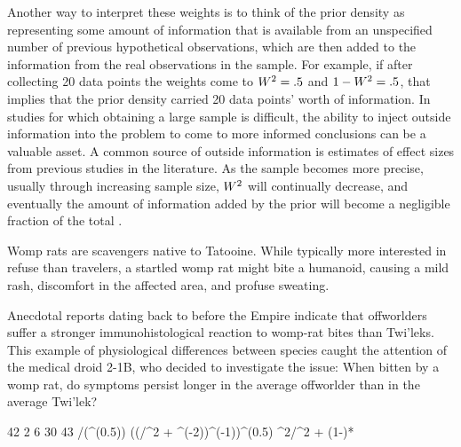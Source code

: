 Another way to interpret these weights is to think of the prior density as representing some amount of information that is available from an unspecified number of previous hypothetical observations, which are then added to the information from the real observations in the sample. For example, if after collecting 20 data points the weights come to $W^2 = .5$ and $1 - W^2 = .5$, that implies that the prior density carried 20 data points' worth of information. In studies for which obtaining a large sample is difficult, the ability to inject outside information into the problem to come to more informed conclusions can be a valuable asset. A common source of outside information is estimates of effect sizes from previous studies in the literature. As the sample becomes more precise, usually through increasing sample size, $W^2$ will continually decrease, and eventually the amount of information added by the prior will become a negligible fraction of the total \cite<see also the principle of stable estimation, described in>{EdwardsEtAl1963}. 

\label{ex:offworlder}
Womp rats are scavengers native to Tatooine. While typically more interested in refuse than travelers, a startled womp rat might bite a humanoid, causing a mild rash, discomfort in the affected area, and profuse sweating.

Anecdotal reports dating back to before the Empire indicate that offworlders suffer a stronger immunohistological reaction to womp-rat bites than Twi'leks. This example of physiological differences between species caught the attention of the medical droid 2-1B, who decided to investigate the issue: When bitten by a womp rat, do symptoms persist longer in the average offworlder than in the average Twi'lek?

\newcommand{\units}{hours}
\FPset{\vmw}    {42}   %
\FPset{\vsigma} { 2}   %
\FPset{\va}     {\vmw} %
\FPset{\vb}     { 6}   %
\FPset{\vn}     {30}   %
\FPset{\vxbar}  {43}   %
\FPeval{\vs}    {\vsigma/(\vn^(0.5))}  %
\FPeval{\vbhat} {((\vn/\vsigma^2 + \vb^(-2))^(-1))^(0.5)}  %
\FPeval{\vW}    {\vbhat^2/\vb^2}  %
\FPeval{\vahat} {\vW*\va + (1-\vW)*\vxbar}  %


